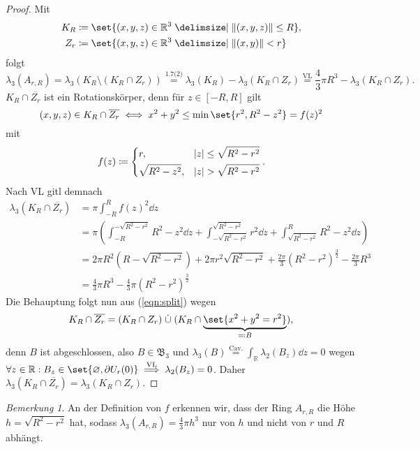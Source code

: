 \documentclass[a4paper, parskip=half]{scrartcl}
\theoremstyle{definition}
\theoremstyle{remark}
\newtheorem*{bemerkung}{Bemerkung}
\begin{document}
	\begin{proof}
		Mit
		\begin{align*}
			K_R &\coloneqq\set{(x, y, z)\in\mathbb{R}^3\given\norm{(x, y, z)}\leq R},\\
			Z_r &\coloneqq\set{(x, y, z)\in\mathbb{R}^3\given\norm{(x, y)} < r}
		\end{align*}
		folgt
		\begin{equation}
			\label{eqn:split}
			\lambda_3(A_{r,R}) = \lambda_3(K_R\setminus (K_R\cap Z_r)) \overset{\text{1.7(2)}}{=} \lambda_3(K_R) - \lambda_3(K_R\cap Z_r)
			\overset{\text{VL}}{=} \frac{4}{3}\pi R^3 -\lambda_3(K_R\cap Z_r).
		\end{equation}
		$K_R\cap \overline{Z_r}$ ist ein Rotationskörper, denn für $z\in[-R, R]$
		gilt
		\[
			(x, y, z)\in K_R\cap\overline{Z_r}\iff x^2+y^2\leq\min\set{r^2, R^2-z^2} = f(z)^2
		\]
		mit
		\[
			f(z)\coloneqq\begin{dcases}
				r, &\abs{z}\leq\sqrt{R^2-r^2}\\
				\sqrt{R^2-z^2}, &\abs{z}>\sqrt{R^2-r^2}
			\end{dcases}.
		\]
		Nach VL gitl demnach
		\begin{align*}
			\lambda_3(K_R\cap\overline{Z_r}) &= \pi\int_{-R}^Rf(z)^2\dd{z}\\
				&= \pi\left(\int_{-R}^{-\sqrt{R^2-r^2}}R^2-z^2\dd{z}
					+\int_{-\sqrt{R^2-r^2}}^{\sqrt{R^2-r^2}}r^2\dd{z}
					+\int_{\sqrt{R^2-r^2}}^RR^2-z^2\dd{z}\right)\\
				&= 2\pi R^2(R-\sqrt{R^2-r^2})+2\pi r^2\sqrt{R^2-r^2}+\frac{2\pi}{3}(R^2-r^2)^\frac{3}{2} -\frac{2\pi}{3}R^3\\
				&= \frac{4}{3}\pi R^3-\frac{4}{3}\pi(R^2-r^2)^\frac{3}{2}
		\end{align*}
		Die Behauptung folgt nun aus (\ref{eqn:split}) wegen
		\[
			K_R\cap\overline{Z_r} = (K_R\cap Z_r) \mathrel{\dot{\cup}} (K_R\cap\underbrace{\set{x^2+y^2=r^2}}_{\eqqcolon B}),
		\]
		denn $B$ ist abgeschlossen, also $B\in\mathfrak{B}_3$ und $\lambda_3(B)\overset{\text{Cav.}}{=}\int_\mathbb{R}\lambda_2(B_z)\dd{z}=0$
		wegen $\forall z\in\mathbb{R}: B_z\in\set{\varnothing, \partial U_r(0)}\overset{\text{VL}}{\implies} \lambda_2(B_z) = 0$. Daher
		$\lambda_3(K_R\cap\overline{Z_r}) = \lambda_3(K_R\cap Z_r)$.
	\end{proof}
	\begin{bemerkung}
		An der Definition von $f$ erkennen wir, dass der Ring $A_{r,R}$ die Höhe
		$h=\sqrt{R^2-r^2}$ hat, sodass $\lambda_3(A_{r, R}) = \frac{4}{3}\pi h^3$ nur
		von $h$ und nicht von $r$ und $R$ abhängt.
	\end{bemerkung}
\end{document}
